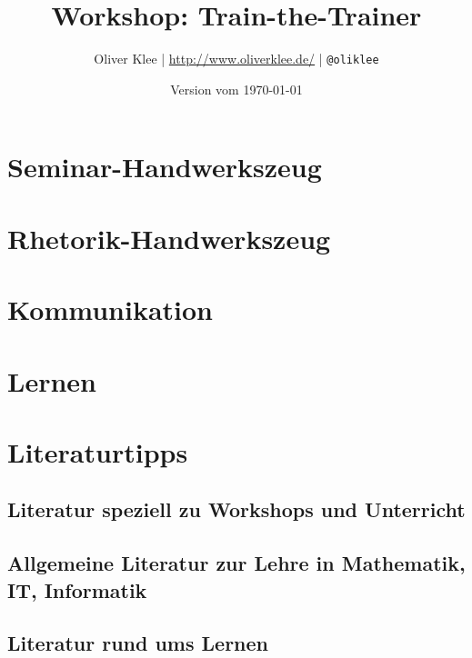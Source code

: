 \documentclass[a4paper,openany,twoside,titlepage,10pt]{scrbook}
\author{Oliver Klee | \url{http://www.oliverklee.de/} | \texttt{@oliklee}}
\title{Workshop: Train-the-Trainer}
\date{Version vom \today}
\begin{document}
\frontmatter

\maketitle

\tableofcontents

\mainmatter

\chapter{Seminar-Handwerkszeug}










\chapter{Rhetorik-Handwerkszeug}




\chapter{Kommunikation}






\chapter{Lernen}












\chapter{Literaturtipps}

\section{Literatur speziell zu Workshops und Unterricht}
\cite{moderationstechniken, visualisieren-praesentieren-moderieren, workshop-buch, treibhaeuser-der-zukunft}

\section{Allgemeine Literatur zur Lehre in Mathematik, IT, Informatik}
\cite{teaching-engineering, red-pen, it-trainer}

\section{Literatur rund ums Lernen}
\cite{denken-lernen-vergessen, lernen-zu-lernen}




\backmatter
\end{document}

